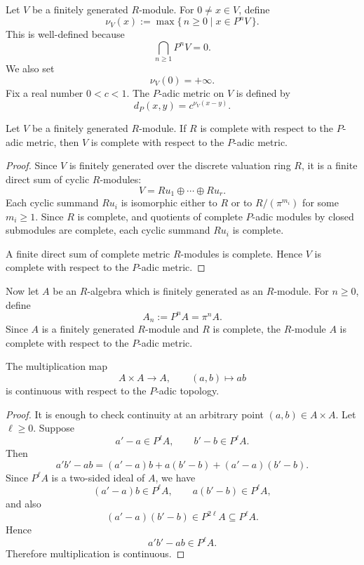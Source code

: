 \begin{definition}
    Let \(V\) be a finitely generated \(R\)-module. For \(0\neq x\in V\), define
    \[
        \nu_V(x):=\max\{\,n\geq 0\mid x\in P^nV\,\}.
    \]
    This is well-defined because
    \[
        \bigcap_{n\geq 1}P^nV=0.
    \]
    We also set
    \[
        \nu_V(0)=+\infty.
    \]
    Fix a real number \(0<c<1\). The \(P\)-adic metric on \(V\) is defined by
    \[
        d_P(x,y)=c^{\nu_V(x-y)}.
    \]
\end{definition}

\begin{theorem}
    Let \(V\) be a finitely generated \(R\)-module. If \(R\) is complete with respect
    to the \(P\)-adic metric, then \(V\) is complete with respect to the \(P\)-adic metric.
\end{theorem}

\begin{proof}
    Since \(V\) is finitely generated over the discrete valuation ring \(R\), it is a
    finite direct sum of cyclic \(R\)-modules:
    \[
        V=Ru_1\oplus \cdots \oplus Ru_r.
    \]
    Each cyclic summand \(Ru_i\) is isomorphic either to \(R\) or to \(R/(\pi^{m_i})\)
    for some \(m_i\geq 1\). Since \(R\) is complete, and quotients of complete
    \(P\)-adic modules by closed submodules are complete, each cyclic summand \(Ru_i\)
    is complete.

    A finite direct sum of complete metric \(R\)-modules is complete. Hence \(V\) is
    complete with respect to the \(P\)-adic metric.
\end{proof}

    Now let \(A\) be an \(R\)-algebra which is finitely generated as an \(R\)-module.
    For \(n\geq 0\), define
    \[
        A_n:=P^nA=\pi^n A.
    \]
    Since \(A\) is a finitely generated \(R\)-module and \(R\) is complete, the
    \(R\)-module \(A\) is complete with respect to the \(P\)-adic metric.

\begin{proposition}
    The multiplication map
    \[
        A\times A\longrightarrow A,
        \qquad
        (a,b)\longmapsto ab
    \]
    is continuous with respect to the \(P\)-adic topology.
\end{proposition}

\begin{proof}
    It is enough to check continuity at an arbitrary point \((a,b)\in A\times A\).
    Let \(\ell\geq 0\). Suppose
    \[
        a'-a\in P^\ell A,
        \qquad
        b'-b\in P^\ell A.
    \]
    Then
    \[
        a'b'-ab
        =
        (a'-a)b+a(b'-b)+(a'-a)(b'-b).
    \]
    Since \(P^\ell A\) is a two-sided ideal of \(A\), we have
    \[
        (a'-a)b\in P^\ell A,
        \qquad
        a(b'-b)\in P^\ell A,
    \]
    and also
    \[
        (a'-a)(b'-b)\in P^{2\ell}A\subseteq P^\ell A.
    \]
    Hence
    \[
        a'b'-ab\in P^\ell A.
    \]
    Therefore multiplication is continuous.
\end{proof}

